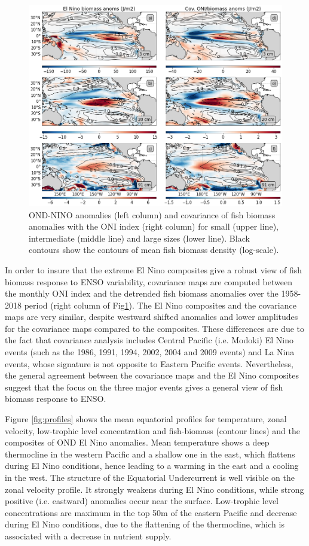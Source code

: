 \begin{figure}[h!tp]
	\centering
	\includegraphics[scale=0.4]{figs/map_mean_anom_OND_97.png}	
	\caption{OND-NINO anomalies (left column) and covariance of fish biomass anomalies with the ONI index (right column) for small (upper line), intermediate (middle line) and large sizes (lower line). Black contours show the contours of mean fish biomass density (log-scale).}	
	\label{fig:mean_ond97_ape}
\end{figure}

In order to insure that the extreme El Nino composites give a robust view of fish biomass response to ENSO variability, covariance maps are computed between the monthly ONI index and the detrended fish biomass anomalies over the 1958-2018 period (right column of Fig\ref{fig:mean_ond97_ape}). The El Nino composites and the covariance maps are very similar, despite westward shifted anomalies and lower amplitudes for the covariance maps compared to the composites. These  differences are due to the fact that covariance analysis includes Central Pacific (i.e. Modoki) El Nino events (such as the 1986, 1991, 1994, 2002, 2004 and 2009 events) and La Nina events, whose signature is not opposite to Eastern Pacific events. Nevertheless, the general agreement between the covariance maps and the El Nino composites suggest that the focus on the three major events gives a general view of fish biomass response to ENSO.

Figure \ref{fig:profiles} shows the mean equatorial profiles for temperature, zonal velocity, low-trophic level concentration and fish-biomass (contour lines) and the composites of OND El Nino anomalies. Mean temperature shows a deep thermocline in the western Pacific and a shallow one in the east, which flattens during El Nino conditions, hence leading to a warming in the east and a cooling in the west. The structure of the Equatorial Undercurrent is well visible on the zonal velocity profile. It strongly weakens during El Nino conditions, while strong positive (i.e. eastward) anomalies occur near the surface. Low-trophic level concentrations are maximum in the top 50m of the eastern Pacific and decrease during El Nino conditions, due to the flattening of the thermocline, which is associated with a decrease in nutrient supply.


